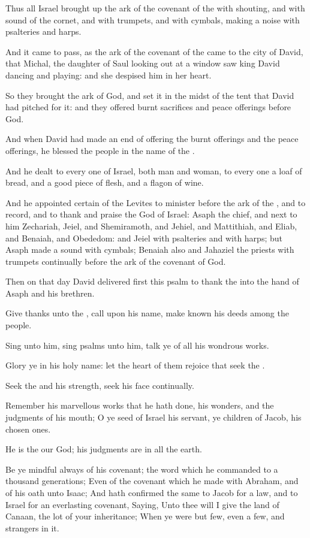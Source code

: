 \Verse Thus all Israel brought up the ark of the covenant of the \LORD with shouting, and with sound of the cornet, and with trumpets, and with cymbals, making a noise with psalteries and harps.

\Verse And it came to pass, as the ark of the covenant of the \LORD came to the city of David, that Michal, the daughter of Saul looking out at a window saw king David dancing and playing: and she despised him in her heart.


\Chapter
\Verse So they brought the ark of God, and set it in the midst of the tent that David had pitched for it: and they offered burnt sacrifices and peace offerings before God.

\Verse And when David had made an end of offering the burnt offerings and the peace offerings, he blessed the people in the name of the \LORD.

\Verse And he dealt to every one of Israel, both man and woman, to every one a loaf of bread, and a good piece of flesh, and a flagon of wine.

\Verse And he appointed certain of the Levites to minister before the ark of the \LORD, and to record, and to thank and praise the \LORD God of Israel: \Verse Asaph the chief, and next to him Zechariah, Jeiel, and Shemiramoth, and Jehiel, and Mattithiah, and Eliab, and Benaiah, and Obededom: and Jeiel with psalteries and with harps; but Asaph made a sound with cymbals; \Verse Benaiah also and Jahaziel the priests with trumpets continually before the ark of the covenant of God.

\Verse Then on that day David delivered first this psalm to thank the \LORD into the hand of Asaph and his brethren.

\Verse Give thanks unto the \LORD, call upon his name, make known his deeds among the people.

\Verse Sing unto him, sing psalms unto him, talk ye of all his wondrous works.

\Verse Glory ye in his holy name: let the heart of them rejoice that seek the \LORD.

\Verse Seek the \LORD and his strength, seek his face continually.

\Verse Remember his marvellous works that he hath done, his wonders, and the judgments of his mouth; \Verse O ye seed of Israel his servant, ye children of Jacob, his chosen ones.

\Verse He is the \LORD our God; his judgments are in all the earth.

\Verse Be ye mindful always of his covenant; the word which he commanded to a thousand generations; \Verse Even of the covenant which he made with Abraham, and of his oath unto Isaac; \Verse And hath confirmed the same to Jacob for a law, and to Israel for an everlasting covenant, \Verse Saying, Unto thee will I give the land of Canaan, the lot of your inheritance; \Verse When ye were but few, even a few, and strangers in it.

